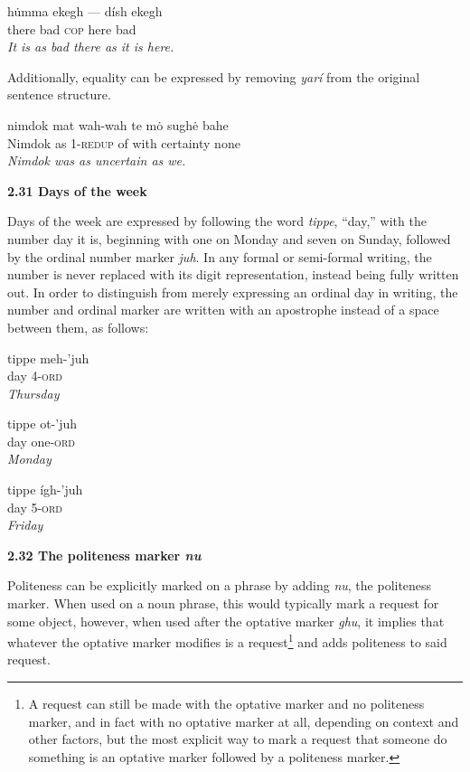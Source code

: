 \documentclass{article}[10pt]
\begin{document}
\begin{exe}
\ex
\gll h\.{u}mma ekegh --- d\'{i}sh ekegh\\
there bad \textsc{cop} here bad\\
\trans \emph{It is as bad there as it is here.}
\end{exe}

Additionally, equality can be expressed by removing \emph{yar\'{i}} from the original sentence structure.

\begin{exe}
\ex
\gll nimdok mat wah-wah te m\.{o} sugh\.{e} bahe\\
Nimdok as 1-\textsc{redup} of with certainty none\\
\trans \emph{Nimdok was as uncertain as we.}
\end{exe}

{\bf 2.31 Days of the week}

Days of the week are expressed by following the word \emph{tippe}, ``day,'' with the number day it is, beginning with one on Monday and seven on Sunday, followed by the ordinal number marker \emph{juh}. In any formal or semi-formal writing, the number is never replaced with its digit representation, instead being fully written out. In order to distinguish from merely expressing an ordinal day in writing, the number and ordinal marker are written with an apostrophe instead of a space between them, as follows:

\begin{exe}
\ex
\gll tippe meh-'juh\\
day 4-\textsc{ord}\\
\trans \emph{Thursday}

\ex
\gll tippe ot-'juh\\
day one-\textsc{ord}\\
\trans \emph{Monday}

\ex
\gll tippe \'{i}gh-'juh\\
day 5-\textsc{ord}\\
\trans \emph{Friday}
\end{exe}

{\bf 2.32 The politeness marker \emph{nu}}

Politeness can be explicitly marked on a phrase by adding \emph{nu}, the politeness marker. When used on a noun phrase, this would typically mark a request for some object, however, when used after the optative marker \emph{ghu}, it implies that whatever the optative marker modifies is a request\footnote{A request can still be made with the optative marker and no politeness marker, and in fact with no optative marker at all, depending on context and other factors, but the most explicit way to mark a request that someone do something is an optative marker followed by a politeness marker.} and adds politeness to said request.
\end{document}
